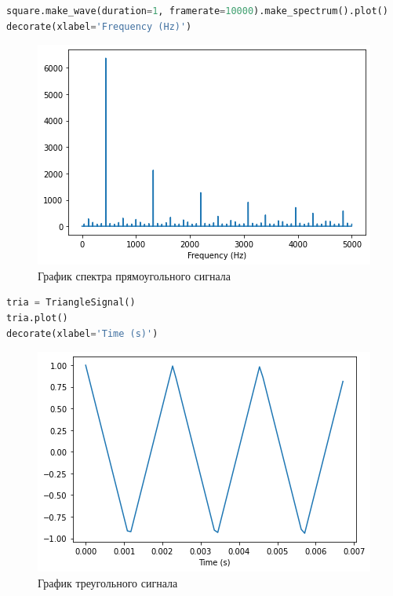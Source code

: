 \begin{lstlisting}[language=Python]
square.make_wave(duration=1, framerate=10000).make_spectrum().plot()
decorate(xlabel='Frequency (Hz)')
\end{lstlisting}

\begin{figure}[H]
	\begin{center}
		\includegraphics[scale=1]{fig/lab02/lab02_04.png}
		\caption{График спектра прямоугольного сигнала}
	\end{center}
\end{figure}


\begin{lstlisting}[language=Python]
tria = TriangleSignal()
tria.plot()
decorate(xlabel='Time (s)')
\end{lstlisting}

\begin{figure}[H]
	\begin{center}
		\includegraphics[scale=1]{fig/lab02/lab02_05.png}
		\caption{График треугольного сигнала}
	\end{center}
\end{figure}

